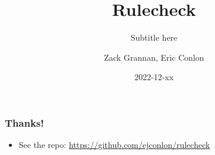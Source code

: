 \documentclass[12pt,aspectratio=169]{beamer}
\title{Rulecheck}
\subtitle{Subtitle here}
\author{Zack Grannan, Eric Conlon}
\date{2022-12-xx}
\begin{document}
\frame{\titlepage}

\begin{frame}
\frametitle{Thanks!}
\begin{itemize}
  \item See the repo: \url{https://github.com/ejconlon/rulecheck}
\end{itemize}
\end{frame}
\end{document}
